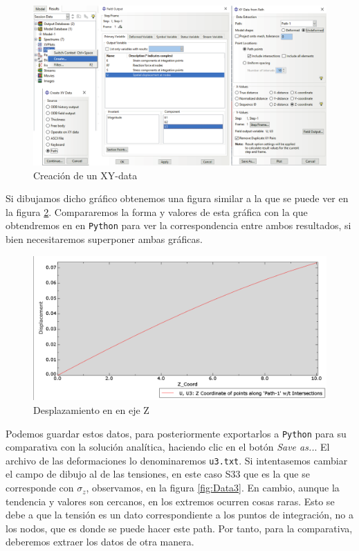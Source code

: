 \documentclass[spanish,a4paper,12pt]{article}
\begin{document}
\begin{figure}[h!tp]
\centering
\includegraphics[scale=0.45]{capturas/U-data.pdf}
\caption{Creación de un XY-data}
\label{fig:Data1}%
\end{figure}

Si dibujamos dicho gráfico obtenemos una figura similar a la que se puede ver en la  figura \ref{fig:Data2}. Compararemos la forma y valores de esta gráfica con la que obtendremos en en \texttt{Python} para ver la correspondencia entre ambos resultados, si bien necesitaremos superponer ambas gráficas.
\clearpage
\begin{figure}[h!tp]
\centering
\includegraphics[scale=0.45]{capturas/U-data2.png}
\caption{Desplazamiento en en eje Z}
\label{fig:Data2}%
\end{figure}

Podemos guardar estos datos, para posteriormente exportarlos a \texttt{Python} para su comparativa con la solución analítica, haciendo clic en el botón \emph{Save as..}. El archivo de las deformaciones lo denominaremos \texttt{u3.txt}. Si intentasemos cambiar el campo de dibujo al de las tensiones, en este caso S33 que es la que se corresponde con $\sigma_z$, observamos, en la figura \ref{fig:Data3}. En cambio, aunque la tendencia y valores son cercanos, en los extremos ocurren cosas raras. Esto se debe a que la tensión es un dato correspondiente a los puntos de integración, no a los nodos, que es donde se puede hacer este path. Por tanto, para la comparativa, deberemos extraer los datos de otra manera.
\end{document}

